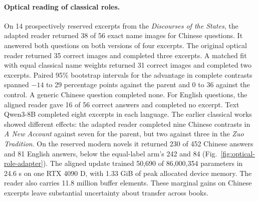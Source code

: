 \paragraph{Optical reading of classical roles.}
On 14 prospectively reserved excerpts from the \textit{Discourses of the States}, the adapted reader returned 38 of 56 exact name images for Chinese questions. It answered both questions on both versions of four excerpts. The original optical reader returned 35 correct images and completed three excerpts. A matched fit with equal classical name weights returned 31 correct images and completed two excerpts. Paired 95\% bootstrap intervals for the advantage in complete contrasts spanned $-14$ to 29 percentage points against the parent and 0 to 36 against the control. A generic Chinese question completed none. For English questions, the aligned reader gave 16 of 56 correct answers and completed no excerpt. Text Qwen3-8B completed eight excerpts in each language. The earlier classical works showed different effects: the adapted reader completed nine Chinese contrasts in \textit{A New Account} against seven for the parent, but two against three in the \textit{Zuo Tradition}. On the reserved modern novels it returned 230 of 452 Chinese answers and 81 English answers, below the equal-label arm's 242 and 84 (Fig.~\ref{fig:optical-role-adapter}). The aligned update trained 50,690 of 86,000,354 parameters in 24.6 s on one RTX 4090 D, with 1.33 GiB of peak allocated device memory. The reader also carries 11.8 million buffer elements. These marginal gains on Chinese excerpts leave substantial uncertainty about transfer across books.
